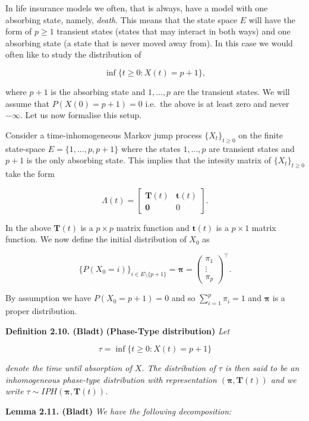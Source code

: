 \documentclass[
]{book}
\begin{document}
In life insurance models we often, that is always, have a model with one absorbing state, namely, \emph{death}. This means that the state space \(E\) will have the form of \(p\ge 1\) transient states (states that may interact in both ways) and one absorbing state (a state that is never moved away from). In this case we would often like to study the distribution of

\[
\inf\{t\ge 0 : X(t)=p+1\},
\]

where \(p+1\) is the absorbing state and \(1,...,p\) are the transient states. We will assume that \(P(X(0)=p+1)=0\) i.e.~the above is at least zero and never \(-\infty\). Let us now formalise this setup.

Consider a time-inhomogeneous Markov jump process \(\{X_t\}_{t\ge 0}\) on the finite state-space \(E=\{1,...,p,p+1\}\) where the states \(1,...,p\) are transient states and \(p+1\) is the only absorbing state. This implies that the intesity matrix of \(\{X_t\}_{t\ge 0}\) take the form

\[
\Lambda(t)=\begin{bmatrix}
\mathbf{T}(t) & \mathbf{t}(t)\\
\mathbf{0} & 0
\end{bmatrix}.
\]

In the above \(\mathbf{T}(t)\) is a \(p\times p\) matrix function and \(\mathbf{t}(t)\) is a \(p\times 1\) matrix function. We now define the initial distribution of \(X_0\) as

\[
\{P(X_0=i)\}_{i\in E\setminus \{p+1\}}=\mathbf{\pi}=\begin{pmatrix}\pi_1\\ \vdots\\ \pi_p\end{pmatrix}^\top.
\]

By assumption we have \(P(X_0=p+1)=0\) and so \(\sum_{i=1}^p\pi_i=1\) and \(\mathbf{\pi}\) is a proper distribution.

\textbf{Definition 2.10. (Bladt)} \textbf{(Phase-Type distribution)} \emph{Let}

\[
\tau = \inf\{t\ge 0 : X(t)=p+1\}
\]

\emph{denote the time until absorption of \(X\). The distribution of \(\tau\) is then said to be an inhomogeneous phase-type distribution with representation \((\mathbf{\pi},\mathbf{T}(t))\) and we write \(\tau \sim IPH(\mathbf{\pi},\mathbf{T}(t))\).}

\textbf{Lemma 2.11. (Bladt)} \emph{We have the following decomposition:}
\end{document}

